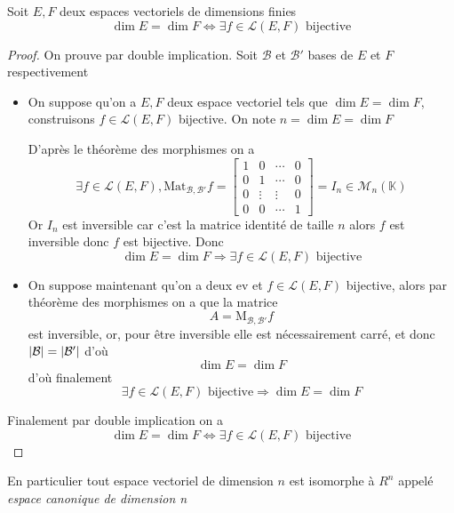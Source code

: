\documentclass[11pt,colorlinks]{book}
\theoremstyle{mytheoremstyle}
\theoremstyle{mytheoremstyle}
\theoremstyle{mytheoremstyle}
\theoremstyle{mytheoremstyle}
\theoremstyle{mytheoremstyle}
\theoremstyle{mytheoremstyle}
\theoremstyle{mytheoremstyle}
\theoremstyle{mytheoremstyle}
\theoremstyle{myproblemstyle}
\def\mbb#1{\mathbb{#1}}
\def\mfc#1{\mathcal{#1}}
\def\bK{\mbb{K}}
\def\ev{espace vectoriel }
\begin{document}
\begin{theorem}
  Soit $E,F$ deux espaces vectoriels de dimensions finies
  \begin{equation*}
    \dim E = \dim F \Leftrightarrow \exists f \in \mfc{L}(E,F) \text{ bijective}
  \end{equation*}
  \begin{proof}
    On prouve par double implication. Soit $\mfc{B}$ et $\mfc{B}'$ bases de $E$ et $F$ respectivement
    
    \begin{itemize}
    \item On suppose qu'on a $E,F$ deux \ev tels que $\dim E = \dim F$, 
    construisons $f \in \mfc{L}(E,F)$ bijective. On note $n = \dim E = \dim F$ 
    

    D'après le théorème des morphismes on a 
    \begin{equation*}
      \exists f \in \mfc{L}(E,F), \text{Mat}_{\mfc{B},\mfc{B'}} f = \begin{bmatrix}
        1 & 0 & \cdots & 0 \\ 
        0 & 1 & \cdots & 0 \\ 
        0 & \vdots & \vdots & 0 \\ 
        0 & 0 & \cdots & 1
      \end{bmatrix} = I_n \in \mfc{M}_n(\bK)
    \end{equation*}
    Or $I_n$ est inversible car c'est la matrice identité de taille $n$ alors $f$ est inversible donc $f$ est bijective.
    Donc 
    \begin{equation*}
      \dim E = \dim F \Rightarrow \exists f \in \mfc{L}(E,F) \text{ bijective}
    \end{equation*}

    \item On suppose maintenant qu'on a deux ev et $f \in \mfc{L}(E,F)$ bijective, alors par théorème des morphismes on a que la matrice
    \begin{equation*}
      A = \text{M}_{\mfc{B},\mfc{B'}} f
    \end{equation*}
    est inversible, or, pour être inversible elle est nécessairement carré, et donc $\abs{\mfc{B}} = \abs{\mfc{B'}}$ d'où 
    \begin{equation*}
      \dim E = \dim F
    \end{equation*}
    d'où finalement 
    \begin{equation*}
      \exists f \in \mfc{L}(E,F) \text{ bijective} \Rightarrow \dim E = \dim F
    \end{equation*}
  \end{itemize}
  
  Finalement par double implication on a 
  \begin{equation*}
    \dim E = \dim F \Leftrightarrow \exists f \in \mfc{L}(E,F) \text{ bijective}
  \end{equation*}

  \end{proof}
\end{theorem}
\begin{rmq}
  En particulier tout \ev de dimension $n$ est isomorphe à $R^n$ appelé \textit{espace canonique de dimension n}
\end{rmq}
\end{document}
